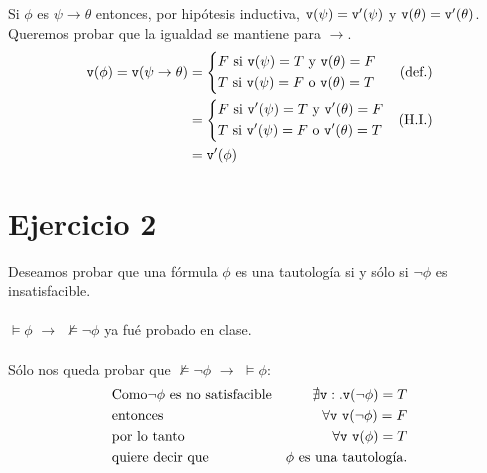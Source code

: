 \documentclass[a4paper,10pt]{article} %
\begin{document}
Si $\phi$ es $\psi\to\theta$ entonces, por hipótesis inductiva, 
$\verb|v|(\psi)=\verb|v|^\prime(\psi)$ y $\verb|v|(\theta)=\verb|v|^\prime(\theta)$.
Queremos probar que la igualdad se mantiene para $\to$.$$
\begin{aligned}
\verb|v|(\phi) = \verb|v|(\psi\to\theta) 
            &= \left\{
                \begin{aligned}
                        & F \text{ si } \verb|v|(\psi)=T \text{ y } \verb|v|(\theta)=F\\
                        & T \text{ si } \verb|v|(\psi)=F \text{ o } \verb|v|(\theta)=T \\
                \end{aligned}
                \right. & \text{(def.)}\\
            &= \left\{
                \begin{aligned}
                    & F \text{ si } \verb|v|^\prime(\psi)=T \text{ y } \verb|v|^\prime(\theta)=F\\
                    & T \text{ si } \verb|v|^\prime(\psi)=F \text{ o } \verb|v|^\prime(\theta)=T \\
                \end{aligned}
                \right. & \text{(H.I.)}\\
            &= \verb|v|^\prime(\phi)
\end{aligned}
$$

\section{Ejercicio 2}

Deseamos probar que una fórmula $\phi$ es una tautología si y sólo si $\neg\phi$ es insatisfacible.
\\\\
$\vDash\phi$ $\to$ $\nvDash\neg\phi$ ya fué probado en clase.
\\\\
Sólo nos queda probar que $\nvDash\neg\phi$ $\to$ $\vDash\phi$: 
$$
\begin{aligned}
&\text{Como} \neg\phi \text{ es no satisfacible} &\nexists\verb|v| :. \verb|v|(\neg\phi)=T \\
&\text{entonces} &\forall\verb|v| \text{ }  \verb|v|(\neg\phi)=F\\
&\text{por lo tanto} &\forall\verb|v| \text{ } \verb|v|(\phi) = T\\
&\text{quiere decir que} &\phi \text{ es una tautología.}
\end{aligned}
$$
\end{document}

